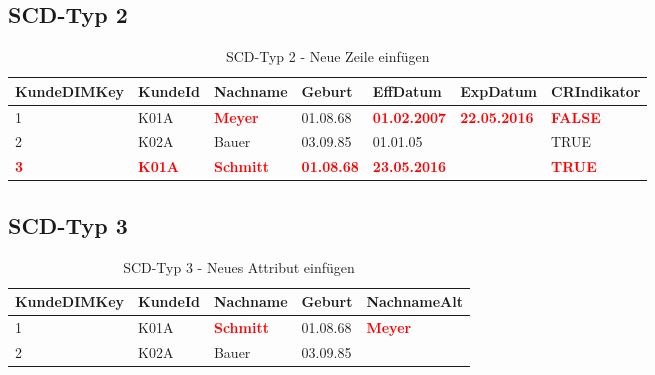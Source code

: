 \subsection{SCD-Typ 2}
\label{sec:uebung_05.aufgabe_1b}

\begin{table}[H]
  \centering
  \ttfamily
  \small
  \begin{tabular}{|l|l|l|l|l|l|l|}
    \hline
    \textbf{KundeDIMKey} & \textbf{KundeId} & \textbf{Nachname} & \textbf{Geburt} & \textbf{EffDatum} & \textbf{ExpDatum} & \textbf{CRIndikator} \\
    \hline
    1 & K01A  & \textbf{\textcolor{red}{Meyer}} & 01.08.68 & \textbf{\textcolor{red}{01.02.2007}} & \textbf{\textcolor{red}{22.05.2016}} & \textbf{\textcolor{red}{FALSE}} \\
    2 & K02A & Bauer & 03.09.85 & 01.01.05 & & TRUE \\
    \textbf{\textcolor{red}{3}} & \textbf{\textcolor{red}{K01A}}  & \textbf{\textcolor{red}{Schmitt}} & \textbf{\textcolor{red}{01.08.68}} & \textbf{\textcolor{red}{23.05.2016}} &  & \textbf{\textcolor{red}{TRUE}} \\
    \hline
  \end{tabular}
  \caption{SCD-Typ 2 - Neue Zeile einfügen}
\end{table}

\subsection{SCD-Typ 3}
\label{sec:uebung_05.aufgabe_1c}

\begin{table}[H]
  \centering
  \ttfamily
  \small
  \begin{tabular}{|l|l|l|l|l|}
    \hline
    \textbf{KundeDIMKey}  & \textbf{KundeId}  & \textbf{Nachname}                 & \textbf{Geburt} & \textbf{NachnameAlt}            \\
    \hline
    1                     & K01A              & \textbf{\textcolor{red}{Schmitt}} & 01.08.68        & \textbf{\textcolor{red}{Meyer}} \\
    2                     & K02A              & Bauer                             & 03.09.85        &                                 \\
    \hline
  \end{tabular}
  \caption{SCD-Typ 3 - Neues Attribut einfügen}
\end{table}
